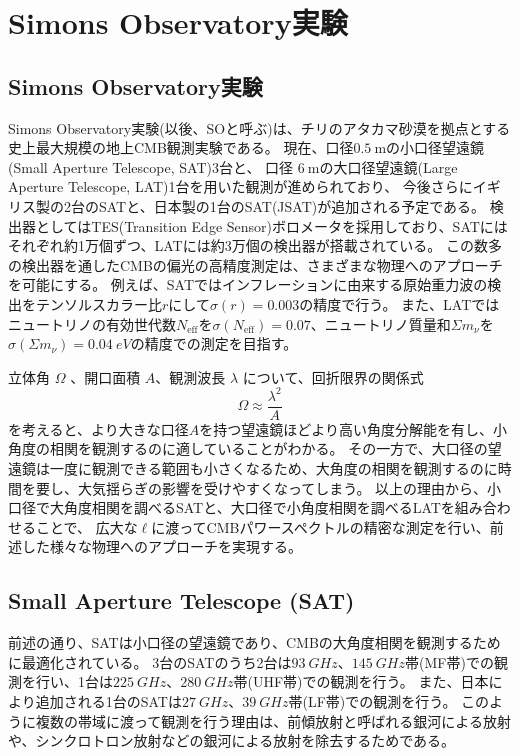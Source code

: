 \documentclass[../../main.tex]{subfiles}
\begin{document}
\chapter{Simons Observatory実験}
\section{Simons Observatory実験}
Simons Observatory実験(以後、SOと呼ぶ)は、チリのアタカマ砂漠を拠点とする史上最大規模の地上CMB観測実験である。
現在、口径$0.5\ \mathrm{m}$の小口径望遠鏡(Small Aperture Telescope, SAT)3台と、
口径 $6\ \mathrm{m}$の大口径望遠鏡(Large Aperture Telescope, LAT)1台を用いた観測が進められており\cite{so:current_status}、
今後さらにイギリス製の2台のSATと、日本製の1台のSAT(JSAT)が追加される予定である。
検出器としてはTES(Transition Edge Sensor)ボロメータを採用しており、SATにはそれぞれ約1万個ずつ、LATには約3万個の検出器が搭載されている。
この数多の検出器を通したCMBの偏光の高精度測定は、さまざまな物理へのアプローチを可能にする。
例えば、SATではインフレーションに由来する原始重力波の検出をテンソルスカラー比$r$にして$\sigma(r)=0.003$の精度で行う。
また、LATではニュートリノの有効世代数$N_\mathrm{eff}$を$\sigma(N_{\mathrm{eff}})=0.07$、ニュートリノ質量和$\Sigma m_\nu$を$\sigma(\Sigma m_\nu)=\SI{0.04}{eV}$の精度での測定を目指す\cite{so:science_forecast}。

立体角 $\Omega$ 、開口面積 $A$、観測波長 $\lambda$ について、回折限界の関係式
\begin{equation}
    \Omega \approx \dfrac{\lambda^2}{A}
\end{equation}
を考えると、より大きな口径$A$を持つ望遠鏡ほどより高い角度分解能を有し、小角度の相関を観測するのに適していることがわかる。
その一方で、大口径の望遠鏡は一度に観測できる範囲も小さくなるため、大角度の相関を観測するのに時間を要し、大気揺らぎの影響を受けやすくなってしまう。
以上の理由から、小口径で大角度相関を調べるSATと、大口径で小角度相関を調べるLATを組み合わせることで、
広大な$\ell$に渡ってCMBパワースペクトルの精密な測定を行い、前述した様々な物理へのアプローチを実現する。
\section{Small Aperture Telescope (SAT)}
前述の通り、SATは小口径の望遠鏡であり、CMBの大角度相関を観測するために最適化されている。
3台のSATのうち2台は$\SI{93}{GHz}$、$\SI{145}{GHz}$帯(MF帯)での観測を行い、1台は$\SI{225}{GHz}$、$\SI{280}{GHz}$帯(UHF帯)での観測を行う。
また、日本により追加される1台のSATは$\SI{27}{GHz}$、$\SI{39}{GHz}$帯(LF帯)での観測を行う。
このように複数の帯域に渡って観測を行う理由は、前傾放射と呼ばれる銀河による放射や、シンクロトロン放射などの銀河による放射を除去するためである。
\end{document}
